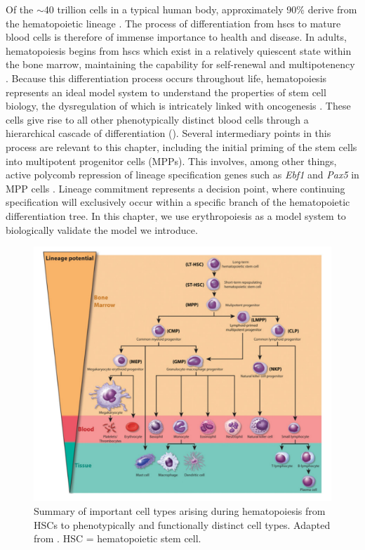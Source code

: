 Of the $\sim$40 trillion cells in a typical human body, approximately 90\% derive from the hematopoietic lineage \cite{Quinlan2010}. The process of differentiation from \glspl{hsc} to mature blood cells is therefore of immense importance to health and disease. In adults, hematopoiesis begins from \glspl{hsc} which exist in a relatively quiescent state within the bone marrow, maintaining the capability for self-renewal and multipotenency \cite{Baron2012}. Because this differentiation process occurs throughout life, hematopoiesis represents an ideal model system to understand the properties of stem cell biology, the dysregulation of which is intricately linked with oncogenesis \cite{Orkin2008}. These cells give rise to all other phenotypically distinct blood cells through a hierarchical cascade of differentiation (). Several intermediary points in this process are relevant to this chapter, including the initial priming of the stem cells into multipotent progenitor cells (MPPs). This involves, among other things, active polycomb repression of lineage specification genes such as \textit{Ebf1} and \textit{Pax5} in MPP cells \cite{H2010}. Lineage commitment represents a decision point, where continuing specification will exclusively occur within a specific branch of the hematopoietic differentiation tree. In this chapter, we use erythropoiesis as a model system to biologically validate the model we introduce. 

\begin{figure}
  \centering
  \includegraphics[width=\textwidth]{plot/ch4/hem.pdf}
  \caption[Hematopoiesis schematic]{Summary of important cell types arising during hematopoiesis from HSCs to phenotypically and functionally distinct cell types. Adapted from \textcite{Hu2016}. HSC = hematopoietic stem cell.}
  \label{fig:hem_sum}
\end{figure}

